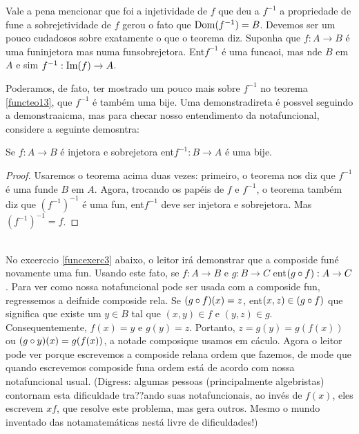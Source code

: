 Vale a pena mencionar que foi a injetividade de $f$ que deu a $f^{-1}$ a propriedade de fun\cao e a sobrejetividade de $f$ gerou o fato que $\operatorname{Dom}(f^{-1})=B$. Devemos ser um pouco cudadosos sobre exatamente o que o teorema diz. Suponha que $f:A\to B$ \'e uma fun\cao injetora mas n\ao uma fun\cao sobrejetora. Ent\ao $f^{-1}$ \'e uma funcaoi, mas n\ao de $B$ em $A$ e sim $f^{-1}:\operatorname{Im}(f)\to A$.

Poder\ih amos, de fato, ter mostrado um pouco mais sobre $f^{-1}$ no teorema \ref{functeo13}, que $f^{-1}$ \'e tamb\'em uma bije\caoi. Uma demonstra\cao direta \'e poss\ih vel seguindo a demonstra\cao aicma, mas para checar nosso entendimento da nota\cao funcional, considere a seguinte demosntra\caoi:
\begin{teob}\label{functeo14}
Se $f:A\to B$ \'e injetora e sobrejetora ent\ao $f^{-1}:B\to A$ \'e uma bije\caoi.
\end{teob}
\begin{proof}
Usaremos o teorema acima duas vezes: primeiro, o teorema nos diz que $f^{-1}$ \'e uma fun\cao de $B$ em $A$. Agora, trocando os pap\'eis de $f$ e $f^{-1}$, o teorema tamb\'em diz que $(f^{-1})^{-1}$ \'e uma fun\caoi, ent\ao $f^{-1}$ deve ser injetora e sobrejetora. Mas $(f^{-1})^{-1}=f$.
\end{proof}
\\

No excerc\ih cio \ref{funcexerc3} abaixo, o leitor ir\'a demonstrar que a composi\cao de fun\coes \'e novamente uma fun\caoi. Usando este fato, se $f:A\to B$ e $g:B\to C$ ent\ao $(g\circ f):A\to C$. Para ver como nossa nota\cao funcional pode ser usada com a composi\cao de fun\cois, regressemos a deifni\cao de composi\cao de rela\cois. Se $(g\circ f)(x)=z$, ent\ao $(x,z)\in (g\circ f)$ que significa que existe um $y\in B$ tal que $(x,y)\in f$ e $(y,z)\in g$. Consequentemente, $f(x)=y$ e $g(y)=z$. Portanto, $z=g(y)=g(f(x))$ ou $(g\circ y)(x)=g(f(x))$, a nota\cao de composi\cao que usamos em c\'aculo. Agora o leitor pode ver porque escrevemos a composi\cao de rela\coes na ordem que fazemos, de mode que quando escrevemos composi\cao de fun\coes a ordem est\'a de acordo com nossa nota\cao funcional usual. (Digress\aoi: algumas pessoas (principalmente algebristas) contornam esta dificuldade tra??ando suas nota\coes funcionais, ao inv\'es de $f(x)$, eles escrevem $xf$, que resolve este problema, mas gera outros. Mesmo o mundo inventado das nota\coes matem\'aticas n\ao est\'a livre de dificuldades!)

